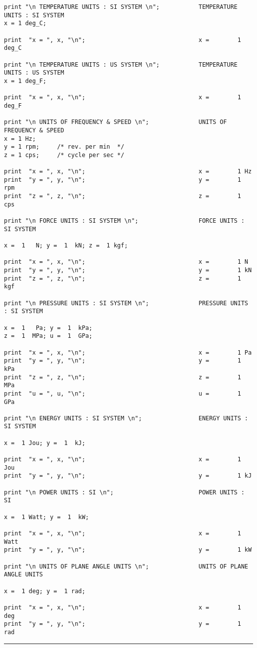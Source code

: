 \begin{footnotesize}
\begin{verbatim}
print "\n TEMPERATURE UNITS : SI SYSTEM \n";           TEMPERATURE UNITS : SI SYSTEM 
x = 1 deg_C;

print  "x = ", x, "\n";                                x =        1 deg_C

print "\n TEMPERATURE UNITS : US SYSTEM \n";           TEMPERATURE UNITS : US SYSTEM 
x = 1 deg_F;

print  "x = ", x, "\n";                                x =        1 deg_F

print "\n UNITS OF FREQUENCY & SPEED \n";              UNITS OF FREQUENCY & SPEED 
x = 1 Hz;
y = 1 rpm;     /* rev. per min  */
z = 1 cps;     /* cycle per sec */

print  "x = ", x, "\n";                                x =        1 Hz
print  "y = ", y, "\n";                                y =        1 rpm
print  "z = ", z, "\n";                                z =        1 cps

print "\n FORCE UNITS : SI SYSTEM \n";                 FORCE UNITS : SI SYSTEM 

x =  1   N; y =  1  kN; z =  1 kgf;

print  "x = ", x, "\n";                                x =        1 N
print  "y = ", y, "\n";                                y =        1 kN
print  "z = ", z, "\n";                                z =        1 kgf

print "\n PRESSURE UNITS : SI SYSTEM \n";              PRESSURE UNITS : SI SYSTEM 

x =  1   Pa; y =  1  kPa;
z =  1  MPa; u =  1  GPa;

print  "x = ", x, "\n";                                x =        1 Pa
print  "y = ", y, "\n";                                y =        1 kPa
print  "z = ", z, "\n";                                z =        1 MPa
print  "u = ", u, "\n";                                u =        1 GPa

print "\n ENERGY UNITS : SI SYSTEM \n";                ENERGY UNITS : SI SYSTEM 

x =  1 Jou; y =  1  kJ;

print  "x = ", x, "\n";                                x =        1 Jou
print  "y = ", y, "\n";                                y =        1 kJ

print "\n POWER UNITS : SI \n";                        POWER UNITS : SI 

x =  1 Watt; y =  1  kW;

print  "x = ", x, "\n";                                x =        1 Watt
print  "y = ", y, "\n";                                y =        1 kW

print "\n UNITS OF PLANE ANGLE UNITS \n";              UNITS OF PLANE ANGLE UNITS 

x =  1 deg; y =  1 rad;

print  "x = ", x, "\n";                                x =        1 deg
print  "y = ", y, "\n";                                y =        1 rad
\end{verbatim}
\rule{6.25 in}{0.035 in}
\end{footnotesize}

